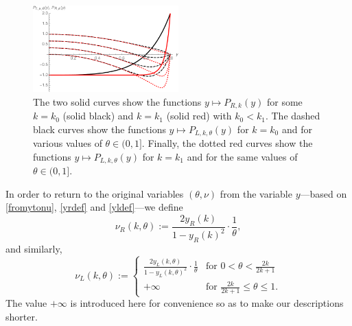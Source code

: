\documentclass[a4paper]{article}
\newcommand{\te}{\theta}
\newcommand{\nul}{\nu_L(k,\theta)}
\newcommand{\nur}{\nu_R(k,\theta)}
\newcommand{\yl}{y_L(k,\theta)}
\newcommand{\yr}{y_R(k)}
\newcommand{\Por}{P_{R,k}(y)}
\newcommand{\Pol}{P_{L,k,\te}(y)}
\begin{document}
\begin{figure}
\begin{center}
\includegraphics[width=0.5\textwidth]{fig_someplpr.pdf}
\caption{The two solid curves show the functions $y\mapsto\Por$ for some $k=k_0$ (solid black) and 
 $k=k_1$ (solid red) with $k_0<k_1$.  The dashed black curves show the functions $y\mapsto\Pol$ for $k=k_0$ and for various values of $\te\in(0,1]$. Finally, the dotted red curves show the functions $y\mapsto\Pol$ for $k=k_1$ and for the same values of $\te\in(0,1]$.}\label{fig_someplpr}
\end{center}
\end{figure}




In order to return to the original variables $(\te,\nu)$ from the variable $y$---based on \eqref{fromytonu},  \eqref{yrdef} and \eqref{yldef}---we define
\begin{equation}\label{nurdef}
\nur:=\frac{2\yr}{1-\yr^2}\cdot \frac{1}{\te},
\end{equation}
and similarly,
\begin{equation}\label{nuldef}
\nul:=\begin{cases}
 \frac{2\yl}{1-\yl^2}\cdot \frac{1}{\te} & \text{for } 0<\te<\frac{2k}{2k+1}\\
 +\infty & \text{for } \frac{2k}{2k+1}\le \te\le 1.
\end{cases}
\end{equation}
The value $+\infty$ is introduced here for convenience so as to make our descriptions shorter.
\end{document}
